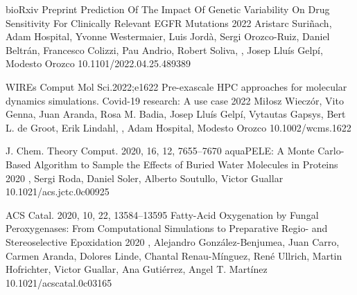 

\begin{cventries}

  \pubentry
    {bioRxiv Preprint} %
    {Prediction Of The Impact Of Genetic Variability On Drug Sensitivity For Clinically Relevant EGFR Mutations} %
    {2022} %
    {} %
    {Aristarc Suriñach, Adam Hospital, Yvonne Westermaier, Luis Jordà, Sergi Orozco-Ruiz, Daniel Beltrán, Francesco Colizzi, Pau Andrio, Robert Soliva, , Josep Lluís Gelpí, Modesto Orozco} %
    {} %
    {10.1101/2022.04.25.489389} %

  \pubentry
    {WIREs Comput Mol Sci.2022;e1622} %
    {Pre-exascale HPC approaches for molecular dynamics simulations. Covid-19 research: A use case} %
    {2022} %
    {} %
    {Miłosz Wieczór, Vito Genna, Juan Aranda, Rosa M. Badia, Josep Lluís Gelpí, Vytautas Gapsys, Bert L. de Groot, Erik Lindahl, , Adam Hospital, Modesto Orozco} %
    {} %
    {10.1002/wcms.1622} %

  \pubentry
    {J. Chem. Theory Comput. 2020, 16, 12, 7655–7670} %
    {aquaPELE: A Monte Carlo-Based Algorithm to Sample the Effects of Buried Water Molecules in Proteins} %
    {2020} %
    {} %
    {, Sergi Roda, Daniel Soler, Alberto Soutullo, Victor Guallar} %
    {} %
    {10.1021/acs.jctc.0c00925} %

  \pubentry
    {ACS Catal. 2020, 10, 22, 13584–13595} %
    {Fatty-Acid Oxygenation by Fungal Peroxygenases: From Computational Simulations to Preparative Regio- and Stereoselective Epoxidation} %
    {2020} %
    {} %
    {, Alejandro González-Benjumea, Juan Carro, Carmen Aranda, Dolores Linde, Chantal Renau-Mínguez, René Ullrich, Martin Hofrichter, Victor Guallar, Ana Gutiérrez, Angel T. Martínez} %
    {} %
    {10.1021/acscatal.0c03165} %


\end{cventries}
